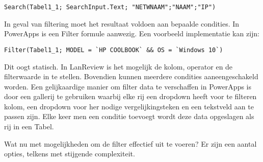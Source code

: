 \begin{lstlisting}
Search(Tabel1_1; SearchInput.Text; "NETWNAAM";"NAAM";"IP")
\end{lstlisting}

In geval van filtering moet het resultaat voldoen aan bepaalde condities. In PowerApps is een Filter formule aanwezig. Een voorbeeld implementatie kan zijn:

\begin{lstlisting}
Filter(Tabel1_1; MODEL = `HP COOLBOOK` && OS = `Windows 10`)
\end{lstlisting}

Dit oogt statisch. In LanReview is het mogelijk de kolom, operator en de filterwaarde in te stellen. Bovendien kunnen meerdere condities aaneengeschakeld worden.
Een gelijkaardige manier om filter data te verschaffen in PowerApps is door een gallerij te gebruiken waarbij elke rij een dropdown heeft voor te filteren kolom, een dropdown voor her nodige vergelijkingsteken en een tekstveld aan te passen zijn. Elke keer men een conditie toevoegt wordt deze data opgeslagen als rij in een Tabel.


Wat nu met mogelijkheden om de filter effectief uit te voeren? Er zijn een aantal opties, telkens met stijgende complexiteit.

